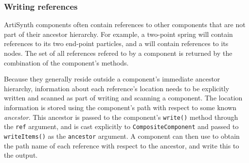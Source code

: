 \documentclass{article}
\begin{document}
\subsubsection{Writing references}
\label{writingReferencesSec}

ArtiSynth components often contain references to other components
that are not part of their ancestor hierarchy. For example, a
two-point spring will contain
references to its two end-point particles, and a
 will contain
references to its nodes. The set of all references refered to
by a component is returned by the combination of the component's
methods.

Because they generally reside outside a component's immediate ancestor
hierarchy, information about each reference's location 
needs to be 
explicitly written and scanned as part of writing and scanning a
component. The location information is stored using the component's
path with respect to some known {\it ancestor}. This ancestor is passed to
the component's {\tt write()} method through the {\tt ref} argument, and is cast
explicitly to {\tt CompositeComponent} and passed to {\tt
writeItems()} as the {\tt ancestor} argument.  A component can
then use
to obtain the path name of each reference with respect to the
ancestor, and write this to the output.
\end{document}
